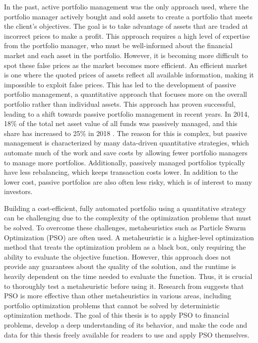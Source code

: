 \documentclass[
  oneside, a4paper, 12pt, openany]{book}
\theoremstyle{definition}
\theoremstyle{definition}
\theoremstyle{definition}
\theoremstyle{definition}
\theoremstyle{remark}
\begin{document}
In the past, active portfolio management was the only approach used, where the portfolio manager actively bought and sold assets to create a portfolio that meets the client's objectives. The goal is to take advantage of assets that are traded at incorrect prices to make a profit. This approach requires a high level of expertise from the portfolio manager, who must be well-informed about the financial market and each asset in the portfolio. However, it is becoming more difficult to spot these false prices as the market becomes more efficient. An efficient market is one where the quoted prices of assets reflect all available information, making it impossible to exploit false prices. This has led to the development of passive portfolio management, a quantitative approach that focuses more on the overall portfolio rather than individual assets. This approach has proven successful, leading to a shift towards passive portfolio management in recent years. In 2014, 18\% of the total net asset value of all funds was passively managed, and this share has increased to 25\% in 2018 \citep{TaDe2019}. The reason for this is complex, but passive management is characterized by many data-driven quantitative strategies, which automate much of the work and save costs by allowing fewer portfolio managers to manage more portfolios. Additionally, passively managed portfolios typically have less rebalancing, which keeps transaction costs lower. In addition to the lower cost, passive portfolios are also often less risky, which is of interest to many investors.

Building a cost-efficient, fully automated portfolio using a quantitative strategy can be challenging due to the complexity of the optimization problems that must be solved. To overcome these challenges, metaheuristics such as Particle Swarm Optimization (PSO) are often used. A metaheuristic is a higher-level optimization method that treats the optimization problem as a black box, only requiring the ability to evaluate the objective function. However, this approach does not provide any guarantees about the quality of the solution, and the runtime is heavily dependent on the time needed to evaluate the function. Thus, it is crucial to thoroughly test a metaheuristic before using it. Research from \citep{BuAd2021} suggests that PSO is more effective than other metaheuristics in various areas, including portfolio optimization problems that cannot be solved by deterministic optimization methods. The goal of this thesis is to apply PSO to financial problems, develop a deep understanding of its behavior, and make the code and data for this thesis freely available for readers to use and apply PSO themselves.
\end{document}
